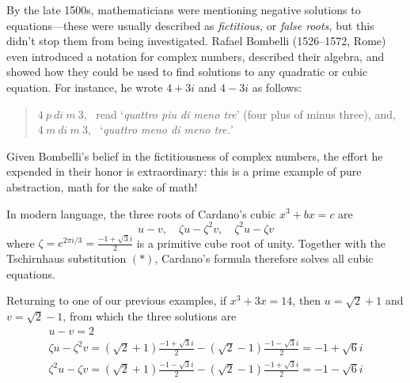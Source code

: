 \goodbreak


By the late 1500s, mathematicians were mentioning negative solutions to equations---these were usually described as \emph{fictitious,} or \emph{false roots,} but this didn't stop them from being investigated. Rafael Bombelli (1526--1572, Rome) even introduced a notation for complex numbers, described their algebra, and showed how they could be used to find solutions to any quadratic or cubic equation. For instance, he wrote $4+3i$ and $4-3i$ as follows:
\begin{quote}
	$4\ p\ di\ m\ 3$, \ read `\emph{quattro piu di meno tre}' (four plus of minus three), and,\\
	$4\ m\ di\ m\ 3$, \ `\emph{quattro meno di meno tre.}'
\end{quote}
Given Bombelli's belief in the fictitiousness of complex numbers, the effort he expended in their honor is extraordinary: this is a prime example of pure abstraction, math for the sake of math!\medbreak

In modern language, the three roots of Cardano's cubic $x^3+bx=c$ are
\[
	u-v,\quad \zeta u-\zeta^2v,\quad \zeta^2u-\zeta v
\]
where $\zeta=e^{2\pi i/3} =\frac{-1+\sqrt 3i}2$ is a primitive cube root of unity. Together with the Tschirnhaus substitution $(\ast)$, Cardano's formula therefore solves all cubic equations.

\goodbreak



\exstart Returning to one of our previous examples, if $x^3+3x=14$, then $u=\sqrt 2+1$ and $v=\sqrt 2-1$, from which the three solutions are
\begin{gather*}
	u-v=2\\
	\zeta u-\zeta^2v=(\sqrt 2+1)\frac{-1+\sqrt 3i}2-(\sqrt 2-1)\frac{-1-\sqrt 3i}2 =-1+\sqrt 6i\\
	\zeta^2u-\zeta v=(\sqrt 2+1)\frac{-1-\sqrt 3i}2-(\sqrt 2-1)\frac{-1+\sqrt 3i}2 =-1-\sqrt 6i
\end{gather*}

